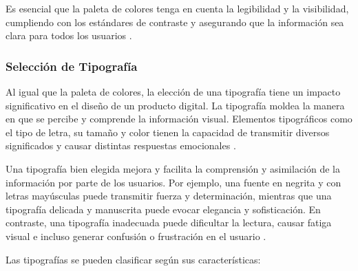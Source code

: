 Es esencial que la paleta de colores tenga en cuenta la legibilidad y la visibilidad, cumpliendo con los estándares de contraste y asegurando que la información sea clara para todos los usuarios \cite{EspacioUXSF}.

\subsubsection{Selección de Tipografía}
Al igual que la paleta de colores, la elección de una tipografía tiene un impacto significativo en el diseño de un producto digital. La tipografía moldea la manera en que se percibe y comprende la información visual. Elementos tipográficos como el tipo de letra, su tamaño y color tienen la capacidad de transmitir diversos significados y causar distintas respuestas emocionales \cite{CamaraSevilla2023}.

Una tipografía bien elegida mejora y facilita la comprensión y asimilación de la información por parte de los usuarios. Por ejemplo, una fuente en negrita y con letras mayúsculas puede transmitir fuerza y determinación, mientras que una tipografía delicada y manuscrita puede evocar elegancia y sofisticación. En contraste, una tipografía inadecuada puede dificultar la lectura, causar fatiga visual e incluso generar confusión o frustración en el usuario \cite{CamaraSevilla2023}.

Las tipografías se pueden clasificar según sus características:

